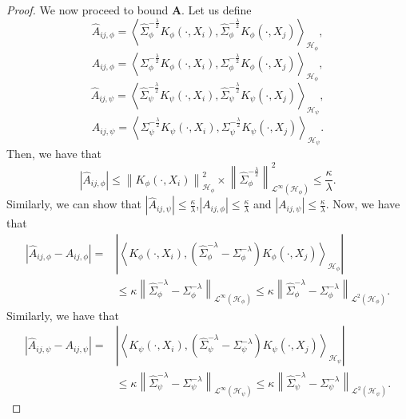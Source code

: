 \documentclass[11pt]{article}
\newcommand{\HS}{\mathcal{L}^{2}}
\newcommand{\Op}{\mathcal{L}^{\infty}}
\newcommand{\repone}{\phi}
\newcommand{\reptwo}{\psi}
\newcommand{\Hone}{\mathcal{H}_{\phi}}
\newcommand{\Htwo}{\mathcal{H}_{\psi}}
\newcommand{\norm}[1]{\left\|#1\right\|}
\newcommand{\inprod}[1]{\left \langle #1 \right\rangle}
\theoremstyle{plain}
\begin{document}
\begin{proof}
We now proceed to bound $\mathbf{A}$. Let us define
\[
\hat{A}_{ij,\repone} = \inprod{\hat{\Sigma}_{\repone}^{-\frac{\lambda}{2}}K_{\repone}(\cdot,X_{i}),\hat{\Sigma}_{\repone}^{-\frac{\lambda}{2}}K_{\repone}(\cdot,X_{j})}_{\Hone},
\]
\[
A_{ij,\repone} = \inprod{\Sigma_{\repone}^{-\frac{\lambda}{2}}K_{\repone}(\cdot,X_{i}),\Sigma_{\repone}^{-\frac{\lambda}{2}}K_{\repone}(\cdot,X_{j})}_{\Hone},
\]
\[
\hat{A}_{ij,\reptwo} = \inprod{\hat{\Sigma}_{\reptwo}^{-\frac{\lambda}{2}}K_{\reptwo}(\cdot,X_{i}),\hat{\Sigma}_{\reptwo}^{-\frac{\lambda}{2}}K_{\reptwo}(\cdot,X_{j})}_{\Htwo},
\]
\[
A_{ij,\reptwo} = \inprod{\Sigma_{\reptwo}^{-\frac{\lambda}{2}}K_{\reptwo}(\cdot,X_{i}),\Sigma_{\reptwo}^{-\frac{\lambda}{2}}K_{\reptwo}(\cdot,X_{j})}_{\Htwo}.
\]
Then, we have that 
\[
\left|\hat{A}_{ij,\repone}\right|\leq \norm{K_{\repone}(\cdot,X_{i})}_{\Hone}^{2} \times \norm{\hat{\Sigma}_{\repone}^{-\frac{\lambda}{2}}}_{\Op(\Hone)}^{2}\leq \frac{\kappa}{\lambda}.
\]
Similarly, we can show that $\left|\hat{A}_{ij,\reptwo}\right|\leq \frac{\kappa}{\lambda}$,$\left|A_{ij,\repone}\right|\leq \frac{\kappa}{\lambda}$ and $\left|A_{ij,\reptwo}\right|\leq \frac{\kappa}{\lambda}$. Now, we have that
\[
\begin{aligned}
    \left|\hat{A}_{ij,\repone} - A_{ij,\repone}\right|
    =&\left|\inprod{K_{\repone}(\cdot,X_{i}),\left(\hat{\Sigma}_{\repone}^{-\lambda}-\Sigma_{\repone}^{-\lambda}\right)K_{\repone}(\cdot,X_{j})}_{\Hone}\right|\\
    &\leq \kappa \norm{\hat{\Sigma}_{\repone}^{-\lambda}-\Sigma_{\repone}^{-\lambda}}_{\Op(\Hone)}
    \leq \kappa \norm{\hat{\Sigma}_{\repone}^{-\lambda}-\Sigma_{\repone}^{-\lambda}}_{\HS(\Hone)}.
\end{aligned}
\]
Similarly, we have that
\[
\begin{aligned}
    \left|\hat{A}_{ij,\reptwo} - A_{ij,\reptwo}\right|=&\left|\inprod{K_{\reptwo}(\cdot,X_{i}),\left(\hat{\Sigma}_{\reptwo}^{-\lambda}-\Sigma_{\reptwo}^{-\lambda}\right)K_{\reptwo}(\cdot,X_{j})}_{\Htwo}\right|\\
    &\leq \kappa \norm{\hat{\Sigma}_{\reptwo}^{-\lambda}-\Sigma_{\reptwo}^{-\lambda}}_{\Op(\Htwo)}
    \leq \kappa \norm{\hat{\Sigma}_{\reptwo}^{-\lambda}-\Sigma_{\reptwo}^{-\lambda}}_{\HS(\Htwo)}.
\end{aligned}
\]


\end{proof}
\end{document}
